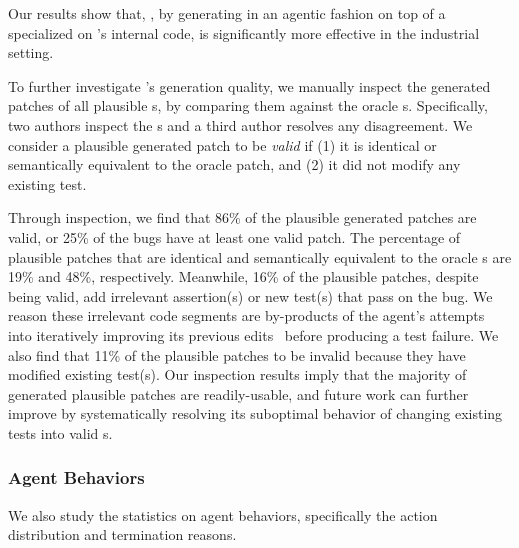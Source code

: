 Our results show that, \tool, by generating \brt in an agentic fashion on top of a \codeeditingllm specialized on \google's internal code, is significantly more effective in the industrial setting.






To further investigate \tool's generation quality, we manually inspect the generated patches of all plausible \brt{}s, by comparing them against the oracle \brt{}s.
Specifically, two authors inspect the \brt{}s and a third author resolves any disagreement.
We consider a plausible generated \brt patch to be \textit{valid} if (1) it is identical or semantically equivalent to the oracle \brt patch, and (2) it did not modify any existing test.

Through inspection, we find that 86\% of the plausible generated \brt patches are valid, or 25\% of the bugs have at least one valid \brt patch.
The percentage of plausible \brt patches that are identical and semantically equivalent to the oracle \brt{}s are 19\% and 48\%, respectively.
Meanwhile, 16\% of the plausible \brt patches, despite being valid, add irrelevant assertion(s) or new test(s) that pass on the bug.
We reason these irrelevant code segments are by-products of the agent's attempts into iteratively improving its previous edits~\cite{jimenez2023swe,rondon2025passerine} before producing a test failure.
We also find that 11\% of the plausible \brt patches to be invalid because they have modified existing test(s).
Our inspection results imply that the majority of generated plausible \brt patches are readily-usable, and future work can further improve \tool by systematically resolving its suboptimal behavior of changing existing tests into valid \brt{}s.

\subsubsection{Agent Behaviors}
\label{sec:results:brt:behave}
We also study the statistics on agent behaviors, specifically the action distribution and termination reasons.


